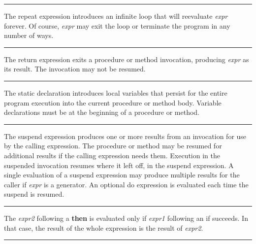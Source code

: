 \bigskip\hrule\vspace{0.1cm}

\noindent
{}The \textsf{repeat} expression
introduces an infinite loop that will reevaluate \textit{expr} forever.
Of course, \textit{expr} may exit the loop or terminate the program in
any number of ways.

\bigskip\hrule\vspace{0.1cm}

\noindent
{}The \textsf{return} expression exits a procedure or method
invocation, producing \textit{expr} as its result. The invocation may
not be resumed.

\bigskip\hrule\vspace{0.1cm}

\noindent
{}The \textsf{static} declaration introduces 
local variables that persist for the entire program execution
into the current procedure or method body. Variable
declarations must be at the beginning of a procedure or method.

\bigskip\hrule\vspace{0.1cm}

\noindent
{}The \textsf{suspend} expression produces one or more
results from an invocation for use by the calling expression. The
procedure or method may be resumed for additional results if the
calling expression needs them. Execution in the suspended invocation
resumes where it left off, in the \textsf{suspend} expression. A single
evaluation of a \textsf{suspend} expression may produce multiple
results for the caller if \textit{expr} is a
generator. An optional \textsf{do} expression is
evaluated each time the \textsf{suspend} is resumed.

\bigskip\hrule\vspace{0.1cm}

\noindent
{}The \textit{expr2} following a \textsf{\bf then} is evaluated
only if \textit{expr1} following an \textsf{if} succeeds. In that case,
the result of the whole expression is the result of \textit{expr2}.


\bigskip\hrule\vspace{0.1cm}


